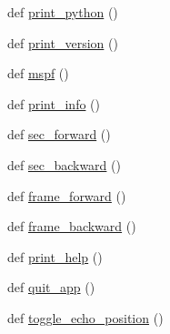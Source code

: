 \begin{DoxyCompactItemize}
\item 
def \hyperlink{namespacevlc_ae0936d317dae71f70be626cab39c5358}{print\+\_\+python} ()
\item 
def \hyperlink{namespacevlc_afaf7aed42d25971d0efaf408a51c8f2d}{print\+\_\+version} ()
\item 
def \hyperlink{namespacevlc_a9bb9b7542f15491284d77fa0a47e711f}{mspf} ()
\item 
def \hyperlink{namespacevlc_afdc9487efb7cea9b4f2b1da4a075dc76}{print\+\_\+info} ()
\item 
def \hyperlink{namespacevlc_ad254a0934cc16b0efe81da452ace868b}{sec\+\_\+forward} ()
\item 
def \hyperlink{namespacevlc_a07c403b7dd6c2fb6ca0db5f0c198686d}{sec\+\_\+backward} ()
\item 
def \hyperlink{namespacevlc_a8ca4660553489d4345fe15e1ff1267a6}{frame\+\_\+forward} ()
\item 
def \hyperlink{namespacevlc_ae7c9e2320876e2cfde006a90ff8ebd90}{frame\+\_\+backward} ()
\item 
def \hyperlink{namespacevlc_a815d75452a68207d96a6cd38f438bd71}{print\+\_\+help} ()
\item 
def \hyperlink{namespacevlc_a6a0bba2d1163dfc99df31893cd79e079}{quit\+\_\+app} ()
\item 
def \hyperlink{namespacevlc_abe636627cfa8857acea999214e26263b}{toggle\+\_\+echo\+\_\+position} ()
\end{DoxyCompactItemize}

